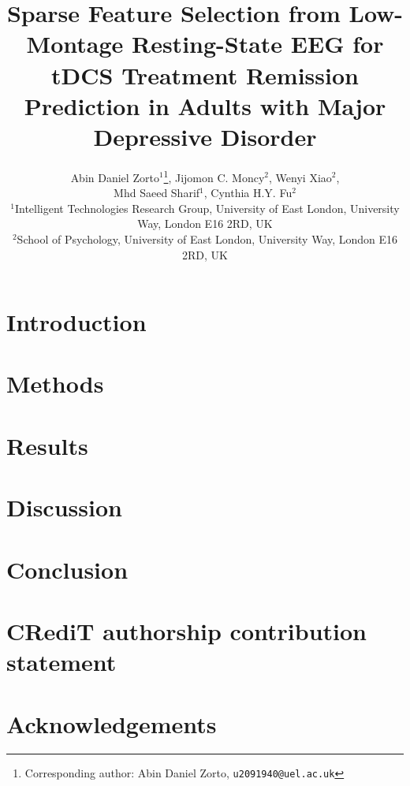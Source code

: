 \documentclass[11pt]{article}
\title{Sparse Feature Selection from Low-Montage Resting-State EEG for tDCS Treatment Remission Prediction in Adults with Major Depressive Disorder}
\author{
\begin{tabular}{>{\centering\arraybackslash}p{0.88\textwidth}}
Abin Daniel Zorto$^{1}$\thanks{Corresponding author: Abin Daniel Zorto, \texttt{u2091940@uel.ac.uk}}, Jijomon C. Moncy$^{2}$, Wenyi Xiao$^{2}$, \\ 
Mhd Saeed Sharif$^{1}$, Cynthia H.Y. Fu$^{2}$ \\[0.75em]
\small $^{1}$Intelligent Technologies Research Group, University of East London, University Way, London E16 2RD, UK \\
\small $^{2}$School of Psychology, University of East London, University Way, London E16 2RD, UK \\
\end{tabular}
}
\date{}
\begin{document}
\maketitle

\begin{abstract}

\end{abstract}

\section{Introduction}


\section{Methods}


\section{Results}


\section{Discussion}


\section{Conclusion}


\section*{CRediT authorship contribution statement}


\section*{Acknowledgements}





\end{document}
